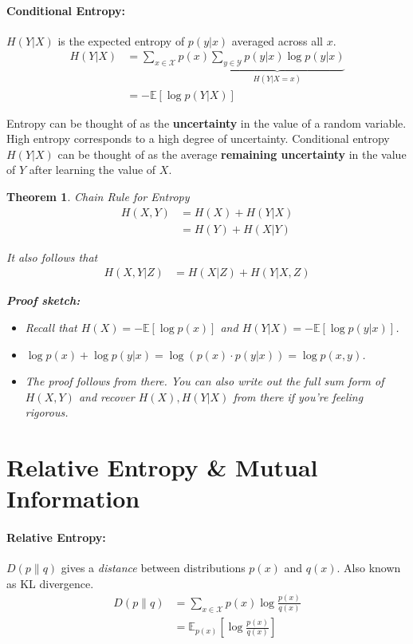\documentclass[a4paper,12pt]{report}
\newtheorem{theorem}{Theorem}
\begin{document}
\paragraph{Conditional Entropy: } $H(Y|X)$ is the expected entropy of $p(y|x)$
averaged across all $x$.
\begin{align}
\label{eqn:conditional_entropy}
H(Y | X) &= \sum_{x\in \mathcal X} p(x) \underbrace{ \sum_{y\in \mathcal Y} p(y
| x) \log p(y | x) }_{H(Y| X = x)} \\
&= - \mathbb E [\log p(Y | X)]
\end{align}



Entropy can be thought of as the \textbf{uncertainty} in the value of a random
variable. High entropy corresponds to a high degree of uncertainty. Conditional
entropy $H(Y|X)$ can be thought of as the average \textbf{remaining uncertainty}
in the value of $Y$ after learning the value of $X$.


\begin{theorem}{Chain Rule for Entropy}
\begin{align}\label{eqn:simple_entropy_chain}
H(X, Y) &= H(X) + H(Y | X) \\
&= H(Y) + H(X | Y)
\end{align}

It also follows that 
\begin{align}
H(X, Y | Z) &= H(X | Z) + H(Y | X, Z) 
\end{align}


\textbf{Proof sketch:} 
\begin{itemize}
\item Recall that $H(X) = -\mathbb E [\log p(x)]$ and $H(Y | X) = -\mathbb E
[\log p(y | x)]$. 
\item $\log p(x) + \log p(y | x) = \log(p(x) \cdot p(y | x)) = \log p(x,y)$.
\item The proof follows from there. You can also write out the full sum form of
$H(X, Y)$ and recover $H(X), H(Y| X)$ from there if you're feeling rigorous.
\end{itemize}
\end{theorem}





\section{Relative Entropy \& Mutual Information}

\paragraph{Relative Entropy: } $D(p \| q)$ gives a \textit{distance} between
distributions $p(x)$ and $q(x)$. Also known as KL divergence. 
\begin{align}
\label{eq:relative_entropy}
D(p \| q) &= \sum_{x\in \mathcal X} p(x) \log \frac{p(x)}{q(x)} \\ 
&= \mathbb E_{p(x)} [\log \frac {p(x)}{q(x)}] \\ 
\end{align}
\end{document}
